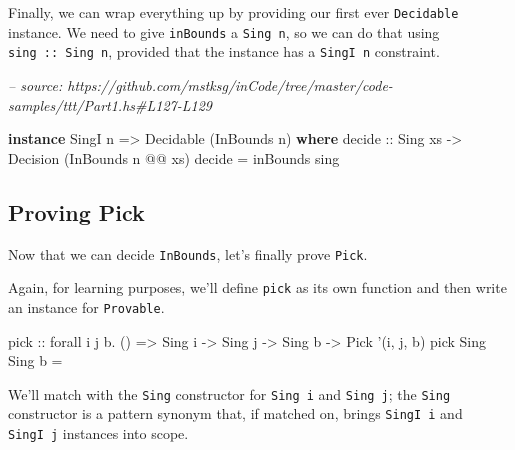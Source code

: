 \documentclass[]{article}
\newenvironment{Shaded}{}{}
\newcommand{\CommentTok}[1]{\textcolor[rgb]{0.38,0.63,0.69}{\textit{#1}}}
\newcommand{\DataTypeTok}[1]{\textcolor[rgb]{0.56,0.13,0.00}{#1}}
\newcommand{\FunctionTok}[1]{\textcolor[rgb]{0.02,0.16,0.49}{#1}}
\newcommand{\KeywordTok}[1]{\textcolor[rgb]{0.00,0.44,0.13}{\textbf{#1}}}
\newcommand{\NormalTok}[1]{#1}
\newcommand{\OtherTok}[1]{\textcolor[rgb]{0.00,0.44,0.13}{#1}}
\begin{document}
Finally, we can wrap everything up by providing our first ever
\texttt{Decidable} instance. We need to give \texttt{inBounds} a
\texttt{Sing\ n}, so we can do that using \texttt{sing\ ::\ Sing\ n}, provided
that the instance has a \texttt{SingI\ n} constraint.

\begin{Shaded}
\begin{Highlighting}[]
\CommentTok{-- source: https://github.com/mstksg/inCode/tree/master/code-samples/ttt/Part1.hs#L127-L129}

\KeywordTok{instance} \DataTypeTok{SingI}\NormalTok{ n }\OtherTok{=>} \DataTypeTok{Decidable}\NormalTok{ (}\DataTypeTok{InBounds}\NormalTok{ n) }\KeywordTok{where}
\OtherTok{    decide ::} \DataTypeTok{Sing}\NormalTok{ xs }\OtherTok{->} \DataTypeTok{Decision}\NormalTok{ (}\DataTypeTok{InBounds}\NormalTok{ n }\FunctionTok{@@}\NormalTok{ xs)}
\NormalTok{    decide }\FunctionTok{=}\NormalTok{ inBounds sing}
\end{Highlighting}
\end{Shaded}

\hypertarget{proving-pick}{%
\subsection{Proving Pick}\label{proving-pick}}

Now that we can decide \texttt{InBounds}, let's finally prove \texttt{Pick}.

Again, for learning purposes, we'll define \texttt{pick} as its own function and
then write an instance for \texttt{Provable}.

\begin{Shaded}
\begin{Highlighting}[]
\NormalTok{pick}
\OtherTok{    ::}\NormalTok{ forall i j b}\FunctionTok{.}\NormalTok{ ()}
    \OtherTok{=>} \DataTypeTok{Sing}\NormalTok{ i}
    \OtherTok{->} \DataTypeTok{Sing}\NormalTok{ j}
    \OtherTok{->} \DataTypeTok{Sing}\NormalTok{ b}
    \OtherTok{->} \DataTypeTok{Pick}\NormalTok{ '(i, j, b)}
\NormalTok{pick }\DataTypeTok{Sing} \DataTypeTok{Sing}\NormalTok{ b }\FunctionTok{=}
\end{Highlighting}
\end{Shaded}

We'll match with the \texttt{Sing} constructor for \texttt{Sing\ i} and
\texttt{Sing\ j}; the \texttt{Sing} constructor is a pattern synonym that, if
matched on, brings \texttt{SingI\ i} and \texttt{SingI\ j} instances into scope.
\end{document}
